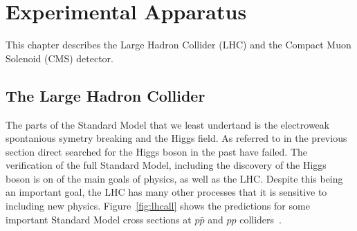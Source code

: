 

\chapter{Experimental Apparatus}

This chapter describes the Large Hadron Collider (LHC) and the Compact Muon Solenoid (CMS) detector.


\section{The Large Hadron Collider}

The parts of the Standard Model that we least undertand is the electroweak spontanious symetry breaking and the Higgs field.  As referred to in the previous section direct searched for the Higgs boson in the past have failed. The verification of the full Standard Model, including the discovery of the Higgs boson is on of the main goals of physics, as well as the LHC.  Despite this being an important goal, the LHC has many other processes that it is sensitive to including new physics. Figure~\ref{fig:lhcall} shows the predictions for some important Standard Model cross sections at  $p \bar p$ and  $pp$  colliders~\cite{Campbell:2006wx}. 

